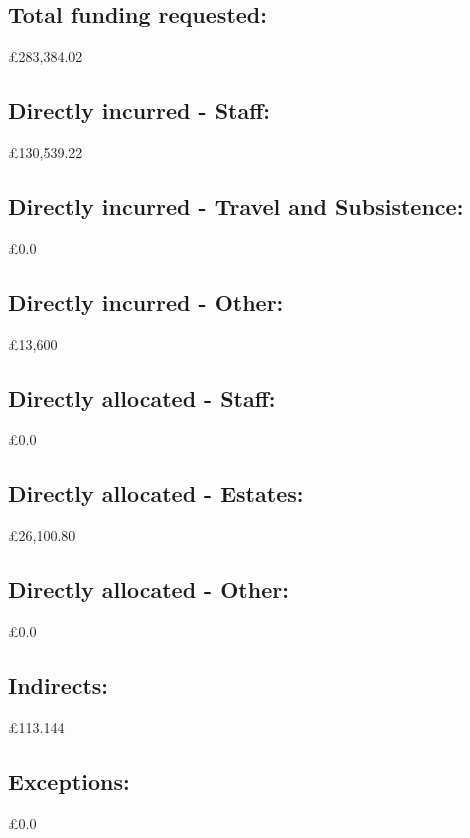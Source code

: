 \documentclass[12pt]{article}
\begin{document}
\subsection{Total funding requested:} £283,384.02

\subsection{Directly incurred - Staff:} £130,539.22

\subsection{Directly incurred - Travel and Subsistence:} £0.0

\subsection{Directly incurred - Other:} £13,600

\subsection{Directly allocated - Staff:} £0.0

\subsection{Directly allocated - Estates:} £26,100.80

\subsection{Directly allocated - Other:} £0.0

\subsection{Indirects:} £113.144

\subsection{Exceptions:} £0.0



\end{document}
